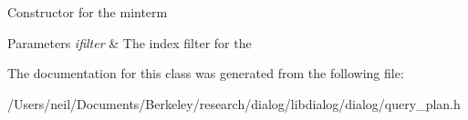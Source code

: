 Constructor for the minterm 
\begin{DoxyParams}{Parameters}
{\em ifilter} & The index filter for the \\
\hline
\end{DoxyParams}


The documentation for this class was generated from the following file\+:\begin{DoxyCompactItemize}
\item 
/\+Users/neil/\+Documents/\+Berkeley/research/dialog/libdialog/dialog/query\+\_\+plan.\+h\end{DoxyCompactItemize}
